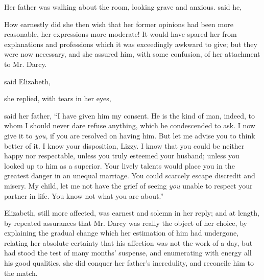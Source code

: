 Her father was walking about the room, looking grave and anxious.  said he, 

How earnestly did she then wish that her former opinions had been more reasonable, her expressions more moderate! It would have spared her from explanations and professions which it was exceedingly awkward to give; but they were now necessary, and she assured him, with some confusion, of her attachment to Mr. Darcy.


 said Elizabeth, 


 she replied, with tears in her eyes, 

 said her father, “I have given him my consent. He is the kind of man, indeed, to whom I should never dare refuse anything, which he condescended to ask. I now give it to {\em you}, if you are resolved on having him. But let me advise you to think better of it. I know your disposition, Lizzy. I know that you could be neither happy nor respectable, unless you truly esteemed your husband; unless you looked up to him as a superior. Your lively talents would place you in the greatest danger in an unequal marriage. You could scarcely escape discredit and misery. My child, let me not have the grief of seeing {\em you} unable to respect your partner in life. You know not what you are about.”

Elizabeth, still more affected, was earnest and solemn in her reply; and at length, by repeated assurances that Mr. Darcy was really the object of her choice, by explaining the gradual change which her estimation of him had undergone, relating her absolute certainty that his affection was not the work of a day, but had stood the test of many months' suspense, and enumerating with energy all his good qualities, she did conquer her father's incredulity, and reconcile him to the match.

